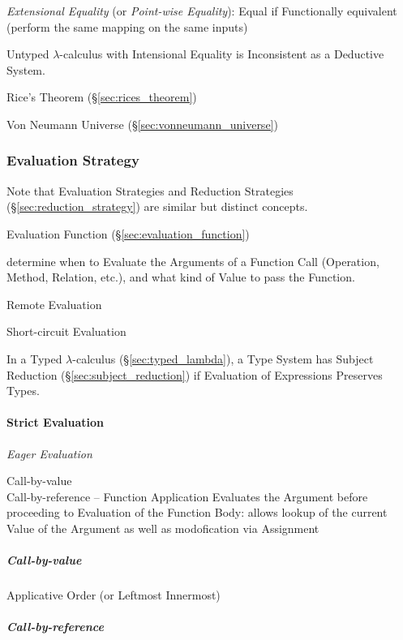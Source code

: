 \emph{Extensional Equality} (or \emph{Point-wise Equality}): Equal if
Functionally equivalent (perform the same mapping on the same inputs)

Untyped $\lambda$-calculus with Intensional Equality is Inconsistent
as a Deductive System.

Rice's Theorem (\S\ref{sec:rices_theorem})

Von Neumann Universe (\S\ref{sec:vonneumann_universe})



\subsubsection{Evaluation Strategy}\label{sec:evaluation_strategy}

\fist Note that Evaluation Strategies and Reduction Strategies
(\S\ref{sec:reduction_strategy}) are similar but distinct concepts.

Evaluation Function (\S\ref{sec:evaluation_function})

determine when to Evaluate the Arguments of a Function Call
(Operation, Method, Relation, etc.), and what kind of Value to pass
the Function.

Remote Evaluation

Short-circuit Evaluation

In a Typed $\lambda$-calculus (\S\ref{sec:typed_lambda}), a Type
System has Subject Reduction (\S\ref{sec:subject_reduction}) if
Evaluation of Expressions Preserves Types.



\paragraph{Strict Evaluation}\label{sec:strict_evaluation}\hfill

\emph{Eager Evaluation}

Call-by-value \\
Call-by-reference -- Function Application Evaluates the Argument
before proceeding to Evaluation of the Function Body: allows lookup of
the current Value of the Argument as well as modofication via
Assignment



\subparagraph{Call-by-value}\label{sec:call_by_value}\hfill

Applicative Order (or Leftmost Innermost)



\subparagraph{Call-by-reference}\label{sec:call_by_reference}\hfill

